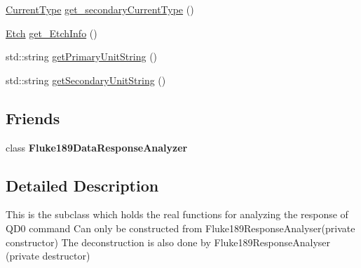 \begin{DoxyCompactItemize}
\hyperlink{classFluke_1_1Fluke189DataResponseAnalyzerWrapper_afef24496da239e3613c40ad3582d7adc}{CurrentType} \hyperlink{classFluke_1_1Fluke189DataResponseAnalyzerWrapperQD0_aa46ac22750b412df37ae24db84fab138}{get\_\-secondaryCurrentType} ()
\item 
\hyperlink{classFluke_1_1Fluke189DataResponseAnalyzerWrapper_ada71f6ab32a7b0eb40bb0ed96d7053bc}{Etch} \hyperlink{classFluke_1_1Fluke189DataResponseAnalyzerWrapperQD0_a8a50c55ebd21461e4c934a1eb4b07641}{get\_\-EtchInfo} ()
\item 
std::string \hyperlink{classFluke_1_1Fluke189DataResponseAnalyzerWrapperQD0_a95eb5efb6652935a968b6063b6ae59ad}{getPrimaryUnitString} ()
\item 
std::string \hyperlink{classFluke_1_1Fluke189DataResponseAnalyzerWrapperQD0_af504a28abc1a4a92a26daf1ccf79150f}{getSecondaryUnitString} ()
\end{DoxyCompactItemize}
\subsection*{Friends}
\begin{DoxyCompactItemize}
\item 
\hypertarget{classFluke_1_1Fluke189DataResponseAnalyzerWrapperQD0_a268eb1bf9fac46f61af93c2c1e309713}{
class {\bfseries Fluke189DataResponseAnalyzer}}
\label{classFluke_1_1Fluke189DataResponseAnalyzerWrapperQD0_a268eb1bf9fac46f61af93c2c1e309713}

\end{DoxyCompactItemize}


\subsection{Detailed Description}
This is the subclass which holds the real functions for analyzing the response of QD0 command Can only be constructed from Fluke189ResponseAnalyser(private constructor) The deconstruction is also done by Fluke189ResponseAnalyser (private destructor) 

